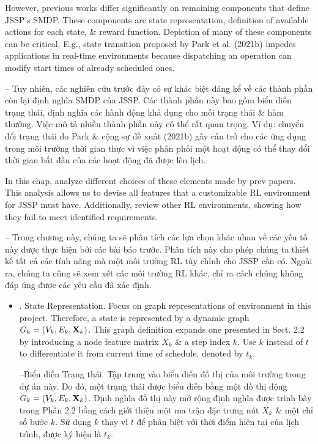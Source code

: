 \documentclass{article}
\begin{document}
\begin{itemize}
    However, previous works differ significantly on remaining components that define JSSP's SMDP. These components are state representation, definition of available actions for each state, \& reward function. Depiction of many of these components can be critical. E.g., state transition proposed by Park et al. (2021b) impedes applications in real-time environments because dispatching an operation can modify start times of already scheduled ones.

    -- Tuy nhiên, các nghiên cứu trước đây có sự khác biệt đáng kể về các thành phần còn lại định nghĩa SMDP của JSSP. Các thành phần này bao gồm biểu diễn trạng thái, định nghĩa các hành động khả dụng cho mỗi trạng thái \& hàm thưởng. Việc mô tả nhiều thành phần này có thể rất quan trọng. Ví dụ: chuyển đổi trạng thái do Park \& cộng sự đề xuất (2021b) gây cản trở cho các ứng dụng trong môi trường thời gian thực vì việc phân phối một hoạt động có thể thay đổi thời gian bắt đầu của các hoạt động đã được lên lịch.

    In this chap, analyze different choices of these elements made by prev papers. This analysis allows us to devise all features that a customizable RL environment for JSSP must have. Additionally, review other RL environments, showing how they fail to meet identified requirements.

    -- Trong chương này, chúng ta sẽ phân tích các lựa chọn khác nhau về các yếu tố này được thực hiện bởi các bài báo trước. Phân tích này cho phép chúng ta thiết kế tất cả các tính năng mà một môi trường RL tùy chỉnh cho JSSP cần có. Ngoài ra, chúng ta cũng sẽ xem xét các môi trường RL khác, chỉ ra cách chúng không đáp ứng được các yêu cầu đã xác định.
    \begin{itemize}
        \item {. State Representation.} Focus on graph representations of environment in this project. Therefore, a state is represented by a dynamic graph $G_k = (V_k,E_k,{\bf X}_k)$. This graph definition expands one presented in Sect. 2.2 by introducing a node feature matrix $X_k$ \& a step index $k$. Use $k$ instead of $t$ to differentiate it from current time of schedule, denoted by $t_k$.

        --{\sf Biểu diễn Trạng thái.} Tập trung vào biểu diễn đồ thị của môi trường trong dự án này. Do đó, một trạng thái được biểu diễn bằng một đồ thị động $G_k = (V_k,E_k,{\bf X}_k)$. Định nghĩa đồ thị này mở rộng định nghĩa được trình bày trong Phần 2.2 bằng cách giới thiệu một ma trận đặc trưng nút $X_k$ \& một chỉ số bước $k$. Sử dụng $k$ thay vì $t$ để phân biệt với thời điểm hiện tại của lịch trình, được ký hiệu là $t_k$.


\end{itemize}
\end{itemize}
\end{document}
